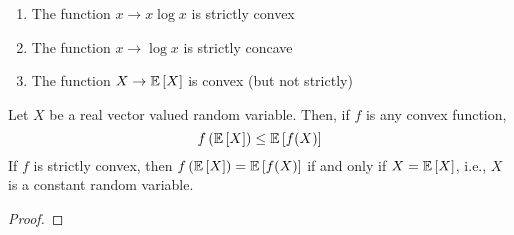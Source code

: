 \begin{example}
    \begin{enumerate}[label=(\arabic*)]
        \item The function $x \to x\log{x}$ is strictly convex
        \item The function $x \to \log{x}$ is strictly concave
        \item The function $X \to \expectation{X}$ is convex (but not strictly)
    \end{enumerate}
\end{example}

\begin{theorem}
    Let $X$ be a real vector valued random variable. Then, if $f$ is any convex
    function,
    \[f\left(\expectation{X}\right) \leq \expectation{f(X)}\]
    If $f$ is strictly convex, then $f\left(\expectation{X}\right) = \expectation{f(X)}$
    if and only if $X = \expectation{X}$, i.e., $X$ is a constant random variable.
\end{theorem}

\begin{proof}

\end{proof}